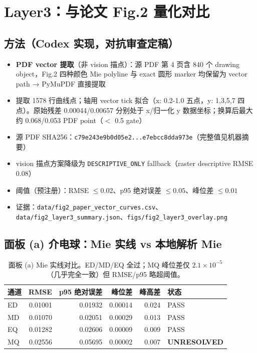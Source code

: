\section{Layer3：与论文 Fig.2 量化对比}

\subsection{方法（Codex 实现，对抗审查定稿）}

\begin{itemize}
  \item \textbf{PDF vector 提取}（非 vision 描点）：源 PDF 第 4 页含 840 个 drawing object，Fig.2 四种颜色 Mie polyline 与 exact 圆形 marker 均保留为 vector path → PyMuPDF 直接提取
  \item 提取 1578 行曲线点；轴用 vector tick 拟合（x: 0.2-1.0 五点，y: 1,3,5,7 四点）。原始残差 0.00044/0.00657 分别处于 x/归一化 y 数据坐标；换算后最大约 0.068/0.053 PDF point（$<$ 0.5 gate）
  \item 源 PDF SHA256：\texttt{c79e243e9b0d05e2...e7ebcc8dda973e}（完整值见机器摘要）
  \item vision 描点方案降级为 \texttt{DESCRIPTIVE\_ONLY} fallback（raster descriptive RMSE 0.08）
  \item 阈值（预注册）：RMSE $\leq 0.02$、p95 绝对误差 $\leq 0.05$、峰位差 $\leq 0.01$
  \item 证据：\texttt{data/fig2\_paper\_vector\_curves.csv}、\texttt{data/fig2\_layer3\_summary.json}、\texttt{figs/fig2\_layer3\_overlay.png}
\end{itemize}

\subsection{面板 (a) 介电球：Mie 实线 vs 本地解析 Mie}

\begin{table}[H]
\centering
\begin{tabular}{lrrrrl}
\toprule
通道 & RMSE & p95 绝对误差 & 峰位差 & 峰高差 & 状态 \\
\midrule
ED & 0.01001 & 0.01932 & 0.00014 & 0.024 & PASS \\
MD & 0.01070 & 0.02051 & 0.00029 & 0.013 & PASS \\
EQ & 0.01282 & 0.02606 & 0.00009 & 0.009 & PASS \\
MQ & 0.02556 & 0.05695 & 0.00002 & 0.007 & \textbf{UNRESOLVED} \\
\bottomrule
\end{tabular}
\caption{面板 (a) Mie 实线对比。ED/MD/EQ 全过；MQ 峰位差仅 $2.1\times10^{-5}$（几乎完全一致）但 RMSE/p95 略超阈值。}
\end{table}

